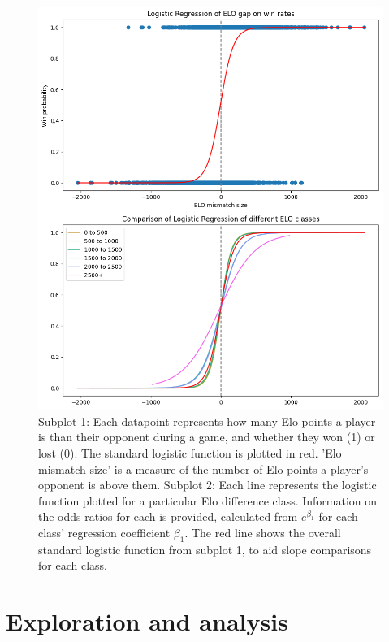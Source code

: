 \documentclass[10pt,a4paper]{article}
\begin{document}
\begin{multicols}{2}
\begin{figure}[p]
  \centering
  \includegraphics[width=\textwidth]{report/images/log_regression_dual.png}
  \caption{Subplot 1: Each datapoint represents how many Elo points a player is than their opponent during a game, and whether they won (1) or lost (0). The standard logistic function is plotted in red. 'Elo mismatch size' is a measure of the number of Elo points a player's opponent is above them. \newline \newline  
  Subplot 2: Each line represents the logistic function plotted for a particular Elo difference class. Information on the odds ratios for each is provided, calculated from $e^{\beta_{1}}$ for each class' regression coefficient $\beta_{1}$. The red line shows the overall standard logistic function from subplot 1, to aid slope comparisons for each class.}
  \label{fds-project-template:fig:log_regression}
\end{figure}


\section{Exploration and  analysis}


\end{multicols}
\end{document}
